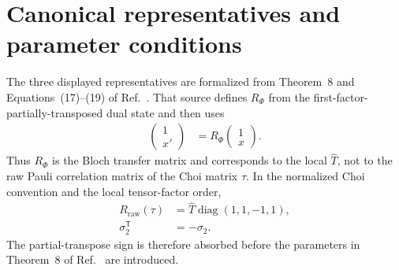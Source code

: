 \documentclass{article}
\begin{document}
\section{Canonical representatives and parameter conditions}

The three displayed representatives are formalized from Theorem~8 and
Equations~(17)--(19) of
Ref.~\cite{VerstraeteVerschelde2002QuantumChannels}. That source defines
$R_\Phi$ from the first-factor-partially-transposed dual state and then uses
\begin{align}
    \begin{pmatrix}1\\x'\end{pmatrix}
        &=R_\Phi
          \begin{pmatrix}1\\x\end{pmatrix}.
    \label{eq:wolf_prop2_11_lorentz_scalar_filtering_gap_bloch_action}
\end{align}
Thus $R_\Phi$ is the Bloch transfer matrix and corresponds to the local
$\widehat T$, not to the raw Pauli correlation matrix of the Choi matrix
$\tau$. In the normalized Choi convention and the local tensor-factor order,
\begin{align}
    R_{\mathrm{raw}}(\tau)
        &=\widehat T\operatorname{diag}(1,1,-1,1),
    \label{eq:wolf_prop2_11_lorentz_scalar_filtering_gap_partial_transpose_bridge}\\
    \sigma_2^{\mathsf T}
        &=-\sigma_2.
    \label{eq:wolf_prop2_11_lorentz_scalar_filtering_gap_pauli_two_transpose}
\end{align}
The partial-transpose sign is therefore absorbed before the parameters in
Theorem~8 of Ref.~\cite{VerstraeteVerschelde2002QuantumChannels} are
introduced.
\end{document}
